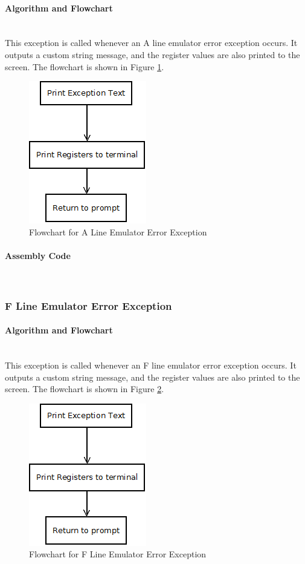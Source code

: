 \documentclass[12pt]{article}
\begin{document}
			\paragraph{Algorithm and Flowchart}~\\
			This exception is called whenever an A line emulator error exception occurs. It outputs a custom string message, and the register values are also printed to the screen. The flowchart is shown in Figure \ref{fig:Aline}.
			\begin{figure}[H]
				\centering
				\includegraphics[width=0.3\linewidth]{Exception}
				\caption{Flowchart for A Line Emulator Error Exception}
				\label{fig:Aline}
			\end{figure}
			\paragraph{Assembly Code}~\\	
			
			\subsubsection{F Line Emulator Error Exception}
			\paragraph{Algorithm and Flowchart}~\\
			This exception is called whenever an F line emulator error exception occurs. It outputs a custom string message, and the register values are also printed to the screen. The flowchart is shown in Figure \ref{fig:Fline}.
			
			\begin{figure}[H]
				\centering
				\includegraphics[width=0.3\linewidth]{Exception}
				\caption{Flowchart for F Line Emulator Error Exception}
				\label{fig:Fline}
			\end{figure}
\end{document}
